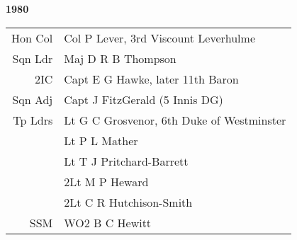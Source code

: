 \begin{center}
  \Huge
  \textbf{1980}
\end{center}

\begin{center}
  \small
  \begin{tabular}{rl}
    Hon Col & Col P Lever, 3rd Viscount Leverhulme \\
    Sqn Ldr & Maj D R B Thompson \\
    2IC & Capt E G Hawke, later 11th Baron \\
    Sqn Adj & Capt J FitzGerald (5 Innis DG) \\
    Tp Ldrs & Lt G C Grosvenor, 6th Duke of Westminster \\
      & Lt P L Mather \\
      & Lt T J Pritchard-Barrett \\
      & 2Lt M P Heward \\
      & 2Lt C R Hutchison-Smith \\
    SSM & WO2 B C Hewitt \\
  \end{tabular}
\end{center}

